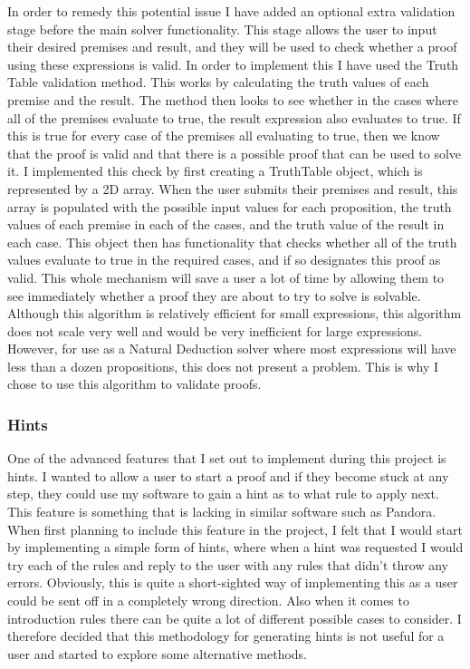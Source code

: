 In order to remedy this potential issue I have added an optional extra validation stage before the main solver functionality. This stage allows the user to input their desired premises and result, and they will be used to check whether a proof using these expressions is valid. In order to implement this I have used the Truth Table validation method. This works by calculating the truth values of each premise and the result. The method then looks to see whether in the cases where all of the premises evaluate to true, the result expression also evaluates to true. If this is true for every case of the premises all evaluating to true, then we know that the proof is valid and that there is a possible proof that can be used to solve it. I implemented this check by first creating a TruthTable object, which is represented by a 2D array. When the user submits their premises and result, this array is populated with the possible input values for each proposition, the truth values of each premise in each of the cases, and the truth value of the result in each case. This object then has functionality that checks whether all of the truth values evaluate to true in the required cases, and if so designates this proof as valid. This whole mechanism will save a user a lot of time by allowing them to see immediately whether a proof they are about to try to solve is solvable. Although this algorithm is relatively efficient for small expressions, this algorithm does not scale very well and would be very inefficient for large expressions. However, for use as a Natural Deduction solver where most expressions will have less than a dozen propositions, this does not present a problem. This is why I chose to use this algorithm to validate proofs. 

\subsubsection{Hints \label{hints}}

One of the advanced features that I set out to implement during this project is hints. I wanted to allow a user to start a proof and if they become stuck at any step, they could use my software to gain a hint as to what rule to apply next. This feature is something that is lacking in similar software such as Pandora. When first planning to include this feature in the project,  I felt that I would start by implementing a simple form of hints, where when a hint was requested I would try each of the rules and reply to the user with any rules that didn't throw any errors. Obviously, this is quite a short-sighted way of implementing this as a user could be sent off in a completely wrong direction. Also when it comes to introduction rules there can be quite a lot of different possible cases to consider. I therefore decided that this methodology for generating hints is not useful for a user and started to explore some alternative methods.

